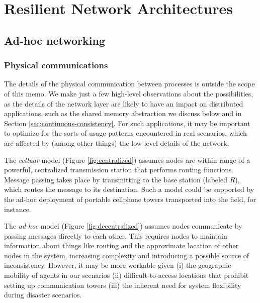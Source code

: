 \documentclass[]             %
{NASA}                       %
\theoremstyle{definition}
\begin{document}
\section{Resilient Network Architectures}
\label{sec:networking}

\subsection{Ad-hoc networking}
\label{ad-hoc-networking}

\subsubsection{Physical communications}
\label{physical-communications}

The details of the physical communication between processes is outside
the scope of this memo. We make just a few high-level observations about
the possibilities, as the details of the network layer are likely to
have an impact on distributed applications, such as the shared memory
abstraction we discuss below and in Section
\ref{sec:continuous-consistency}. For such applications, it may be
important to optimize for the sorts of usage patterns encountered in
real scenarios, which are affected by (among other things) the low-level
details of the network.

The \emph{celluar} model (Figure \ref{fig:centralized}) assumes nodes
are within range of a powerful, centralized transmission station that
performs routing functions. Message passing takes place by transmitting
to the base station (labeled \(R\)), which routes the message to its
destination. Such a model could be supported by the ad-hoc deployment of
portable cellphone towers transported into the field, for instance.

The \emph{ad-hoc} model (Figure \ref{fig:decentralized}) assumes nodes
communicate by passing messages directly to each other. This requires
nodes to maintain information about things like routing and the
approximate location of other nodes in the system, increasing complexity
and introducing a possible source of inconsistency. However, it may be
more workable given (i) the geographic mobility of agents in our
scenarios (ii) difficult-to-access locations that prohibit setting up
communication towers (iii) the inherent need for system flexibility
during disaster scenarios.
\end{document}
